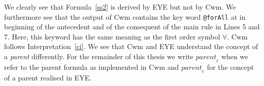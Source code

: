 % 
% 
We clearly see that Formula~\ref{ss2} is derived by EYE but not by Cwm. 
We furthermore see that the output of Cwm contains the key word \texttt{@forAll} at in beginning of the antecedent and of the consequent of the main rule in Lines 5 and 7. 
Here, this keyword has the same meaning as the first order symbol $\forall$. Cwm follows Interpretation~\ref{ci}.  We see that 
Cwm and EYE understand the concept of a \emph{parent} differently. 
For the remainder of this thesis we write $\textit{parent}_c$ when we refer to the parent formula as implemented in Cwm and $\textit{parent}_e$ 
for the concept of a parent realised in EYE.

